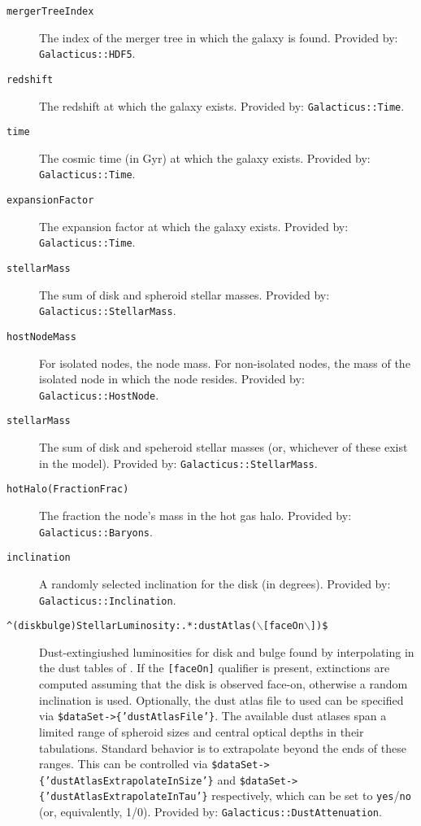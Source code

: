 \begin{description}
 \item[{\tt mergerTreeIndex}] The index of the merger tree in which the galaxy is found. Provided by: {\tt Galacticus::HDF5}.
 \item[{\tt redshift}] The redshift at which the galaxy exists. Provided by: {\tt Galacticus::Time}.
 \item[{\tt time}] The cosmic time (in Gyr) at which the galaxy exists. Provided by: {\tt Galacticus::Time}.
 \item[{\tt expansionFactor}] The expansion factor at which the galaxy exists. Provided by: {\tt Galacticus::Time}.
 \item[{\tt stellarMass}] The sum of disk and spheroid stellar masses. Provided by: {\tt Galacticus::StellarMass}.
 \item[{\tt hostNodeMass}] For isolated nodes, the node mass. For non-isolated nodes, the mass of the isolated node in which the node resides. Provided by: {\tt Galacticus::HostNode}.
 \item[{\tt stellarMass}] The sum of disk and speheroid stellar masses (or, whichever of these exist in the model). Provided by: {\tt Galacticus::StellarMass}.
 \item[{\tt hotHalo(Fraction\textbar Frac)}] The fraction the node's mass in the hot gas halo. Provided by: {\tt Galacticus::Baryons}.
 \item[{\tt inclination}] A randomly selected inclination for the disk (in degrees). Provided by: {\tt Galacticus::Inclination}.
 \item[{\tt \textasciicircum(disk\textbar bulge)StellarLuminosity:.*:dustAtlas($\backslash$[faceOn$\backslash$])\$}] Dust-extingiushed luminosities for disk and bulge found by interpolating in the dust tables of \cite{ferrara_atlas_1999}. If the {\tt [faceOn]} qualifier is present, extinctions are computed assuming that the disk is observed face-on, otherwise a random inclination is used. Optionally, the dust atlas file to used can be specified via {\tt \$dataSet-\textgreater\{'dustAtlasFile'\}}. The available dust atlases span a limited range of spheroid sizes and central optical depths in their tabulations. Standard behavior is to extrapolate beyond the ends of these ranges. This can be controlled via {\tt \$dataSet-\textgreater\{'dustAtlasExtrapolateInSize'\}} and {\tt \$dataSet-\textgreater\{'dustAtlasExtrapolateInTau'\}} respectively, which can be set to {\tt yes}/{\tt no} (or, equivalently, 1/0). Provided by: {\tt Galacticus::DustAttenuation}.

\end{description}
